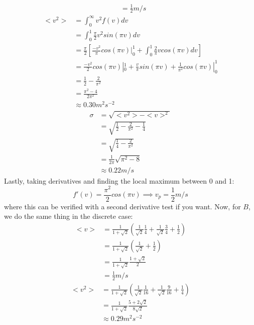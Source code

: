 \documentclass{article}
\begin{document}
\begin{itemize}
\begin{align*}
	&= \frac{1}{2} m/s
	\end{align*}
	\begin{align*}
	<v^2> &= \int_0^{\infty} v^2f(v)dv \\
	&= \int_0^1 \frac{\pi}{2}v^2sin(\pi v)dv \\
	&= \frac{\pi}{2}\left[\frac{-v^2}{\pi}cos(\pi v)|_0^1 + \int_0^1\frac{2}{\pi}vcos(\pi v)dv\right] \\
	&= \frac{-v^2}{2}cos(\pi v)|_0^1 + \frac{v}{\pi} sin(\pi v) + \frac{1}{\pi^2}cos(\pi v)|_0^1 \\
	&= \frac{1}{2} - \frac{2}{\pi^2} \\
	&= \frac{\pi^2-4}{2\pi^2} \\
	&\approx 0.30 m^2 s^{-2}
	\end{align*}
	\begin{align*}
	\sigma &= \sqrt{<v^2>-<v>^2} \\
	&= \sqrt{\frac{1}{2}-\frac{2}{\pi^2}-\frac{1}{4}} \\
	&= \sqrt{\frac{1}{4}-\frac{2}{\pi^2}} \\
	&= \frac{1}{2\pi}\sqrt{\pi^2-8} \\
	&\approx 0.22 m/s
	\end{align*}
	Lastly, taking derivatives and finding the local maximum between 0 and 1:
	\begin{equation}
	f'(v) = \frac{\pi^2}{2}cos(\pi v) \implies v_p=\frac{1}{2} m/s
	\end{equation}
	where this can be verified with a second derivative test if you want.
	Now, for $B$, we do the same thing in the discrete case:
	\begin{align*}
	<v> &= \frac{1}{1+\sqrt{2}}\left(\frac{1}{\sqrt{2}}\frac{1}{4} + \frac{1}{\sqrt{2}}\frac{3}{4} + \frac{1}{2}\right) \\
	&= \frac{1}{1+\sqrt{2}}\left(\frac{1}{\sqrt{2}}+\frac{1}{2}\right) \\
	&= \frac{1}{1+\sqrt{2}}\frac{1+\sqrt{2}}{2} \\
	&= \frac{1}{2} m/s
	\end{align*}
	\begin{align*}
	<v^2> &= \frac{1}{1+\sqrt{2}}\left(\frac{1}{\sqrt{2}}\frac{1}{16} + \frac{1}{\sqrt{2}}\frac{9}{16} + \frac{1}{4}\right) \\
	&= \frac{1}{1+\sqrt{2}}\frac{5+2\sqrt{2}}{8\sqrt{2}} \\
	&\approx 0.29 m^2 s^{-2} \\
	\end{align*}
	\begin{align*}

\end{align*}
\end{itemize}
\end{document}
